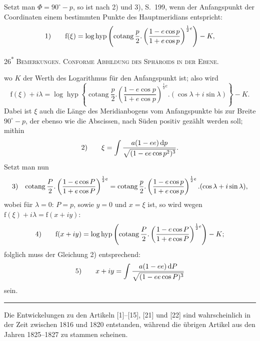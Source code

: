 Setzt man $\Phi=90^\circ-p$, so ist nach 2) und 3), S.~199, wenn der Anfangspunkt der Coordinaten einem bestimmten Punkte des Hauptmeridians entspricht:
\[
\begin{array}{r@{\qquad}l}
1)&\displaystyle\mathrm f(\xi)=\log\operatorname{hyp}
\left(\operatorname{cotang}\frac p2.\left(\frac{1-e\cos p}{1+e\cos p}\right)^{\frac12e}\right)-K,
\end{array}
\]
\par\endgroup
\vfill\noindent\hfill26\textsuperscript{$\ast$}\hspace*{2cm}
\clearpage
{}\hfill\textsc{Bemerkungen. Conforme Abbildung des Sphäroids in der Ebene.}\par\medskip
\begingroup\footnotesize
wo $K$ der Werth des Logarithmus für den Anfangspunkt ist; also wird
\[
\mathrm f(\xi)+i\lambda=\log\operatorname{hyp}\left\{\operatorname{cotang}\frac p2.\left(\frac{1-e\cos p}{1+e\cos p}\right)^{\frac12e}.(\cos\lambda+i\sin\lambda)\right\}-K.
\]
Dabei ist $\xi$ auch die Länge des Meridianbogens vom Anfangspunkte bis zur Breite $90^\circ-p$, der ebenso wie die Abscissen, nach Süden positiv gezählt werden soll; mithin
\[
\begin{array}{r@{\qquad}l}
2)&\displaystyle\xi=\int\frac{a(1-ee)\,\mathrm dp}{\sqrt{(1-ee\cos p^2)^3}}.
\end{array}
\]
Setzt man nun
\[
\begin{array}{r@{\quad}l}
3)&\displaystyle\operatorname{cotang}\frac P2.\left(\frac{1-e\cos P}{1+e\cos P}\right)^{\frac12e}
=\operatorname{cotang}\frac p2.\left(\frac{1-e\cos p}{1+e\cos p}\right)^{\frac12e}.(\cos\lambda+i\sin\lambda),
\end{array}
\]
wobei für $\lambda=0$: $P=p$, sowie $y=0$ und $x=\xi$ ist, so wird wegen $\mathrm f(\xi)+i\lambda=\mathrm f(x+iy)$:
\[
\begin{array}{r@{\qquad}l}
4)&\displaystyle\mathrm f(x+iy)=\log\operatorname{hyp}\left(\operatorname{cotang}\frac P2.\left(\frac{1-e\cos P}{1+e\cos P}\right)^{\frac12e}\right)-K;
\end{array}
\]
folglich muss der Gleichung 2) entsprechend:
\[
\begin{array}{r@{\qquad}l}
5)&\displaystyle x+iy=\int\frac{a(1-ee)\,\mathrm dP}{\sqrt{(1-ee\cos P)^3}}
\end{array}
\]
sein.
\begin{center}\rule{4cm}{.4pt}\end{center}
\bigskip
Die Entwickelungen zu den Artikeln [1]--[15], [21] und [22] sind wahrscheinlich in der Zeit zwischen 1816 und 1820 entstanden, während die übrigen Artikel aus den Jahren 1825--1827 zu stammen scheinen.
